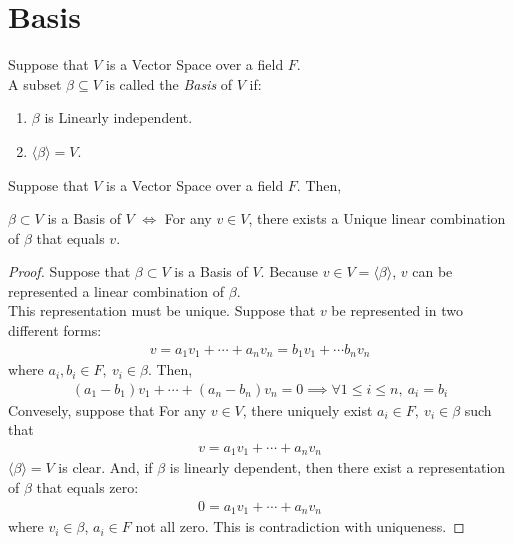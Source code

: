\section{Basis}
\begin{definition}
    Suppose that $V$ is a Vector Space over a field $F$. \\
    A subset $\beta \subseteq V$ is called the \textit{Basis} of $V$ if:
    \begin{enumerate}
        \item $\beta$ is Linearly independent. 
        \item $\langle \beta \rangle = V$.
    \end{enumerate}
\end{definition}
\begin{lemma}
    Suppose that $V$ is a Vector Space over a field $F$. Then,
    \begin{center}
        $\beta \subset V$ is a Basis of $V$
        $\iff$
        For any $v \in V$, there exists a Unique linear combination of $\beta$ that equals $v$.
    \end{center}
\end{lemma}
\begin{proof}
    Suppose that $\beta \subset V$ is a Basis of $V$. 
    Because $v \in V = \langle \beta \rangle$, $v$ can be represented a linear combination of $\beta$. \\
    This representation must be unique. Suppose that $v$ be represented in two different forms:
    \begin{align*}
        v = a_1 v_1 + \cdots + a_n v_n = b_1 v_1 + \cdots b_n v_n
    \end{align*}
    where $a_i, b_i \in F,\ v_i \in \beta$. Then,
    \begin{align*}
        (a_1 - b_1) v_1 + \cdots + (a_n - b_n) v_n = 0 \implies \forall 1 \leq i \leq n,\ a_i = b_i
    \end{align*}
    Convesely, suppose that For any $v \in V$, there uniquely exist $a_i \in F,\ v_i \in \beta$ such that
    \begin{align*}
        v = a_1 v_1 + \cdots + a_n v_n
    \end{align*}
    $\langle \beta \rangle = V$ is clear. And, if $\beta$ is linearly dependent, then
    there exist a representation of $\beta$ that equals zero:
    \begin{align*}
        0 = a_1 v_1 + \cdots + a_n v_n
    \end{align*}
    where $v_i \in \beta$, $a_i \in F$ not all zero.
    This is contradiction with uniqueness.
\end{proof}

